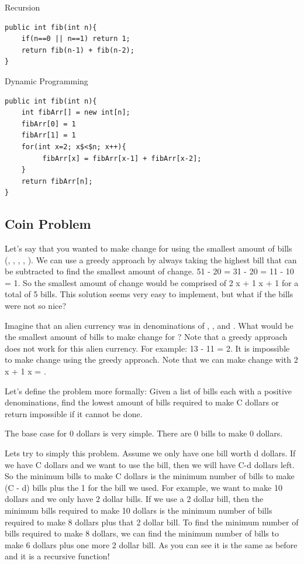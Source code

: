 \documentclass[11pt,oneside]{book}
\begin{document}
Recursion

\begin{lstlisting}
public int fib(int n){
    if(n==0 || n==1) return 1;
    return fib(n-1) + fib(n-2);
}
\end{lstlisting}

Dynamic Programming

\begin{lstlisting}
public int fib(int n){
    int fibArr[] = new int[n];
    fibArr[0] = 1
    fibArr[1] = 1
    for(int x=2; x$<$n; x++){
         fibArr[x] = fibArr[x-1] + fibArr[x-2];
    }
    return fibArr[n];
}
\end{lstlisting}

\subsection{Coin Problem}

Let's say that you wanted to make change for  using the smallest amount of bills (, , , , ). We can use a greedy approach by always taking the highest bill that can be subtracted to find the smallest amount of change. 51 - 20 = 31 - 20 = 11 - 10 = 1. So the smallest amount of change would be comprised of 2 x  + 1 x  + 1 for a total of 5 bills. This solution seems very easy to implement, but what if the bills were not so nice?

Imagine that an alien currency was in denominations of , ,  and . What would be the smallest amount of bills to make change for ? Note that a greedy approach does not work for this alien currency. For example: 13 - 11 = 2. It is impossible to make change using the greedy approach. Note that we can make change with 2 x  + 1 x  = .

Let's define the problem more formally: Given a list of bills each with a positive denominations, find the lowest amount of bills required to make C dollars or return impossible if it cannot be done.

The base case for 0 dollars is very simple. There are 0 bills to make 0 dollars.

Lets try to simply this problem. Assume we only have one bill worth d dollars. If we have C dollars and we want to use the bill, then we will have C-d dollars left. So the minimum bills to make C dollars is the minimum number of bills to make (C - d) bills plus the 1 for the bill we used. For example, we want to make 10 dollars and we only have 2 dollar bills. If we use a 2 dollar bill, then the minimum bills required to make 10 dollars is the minimum number of bills required to make 8 dollars plus that 2 dollar bill. To find the minimum number of bills required to make 8 dollars, we can find the minimum number of bills to make 6 dollars plus one more 2 dollar bill. As you can see it is the same as before and it is a recursive function!
\end{document}
